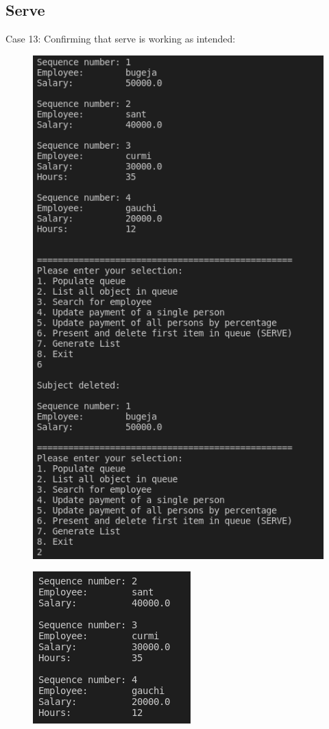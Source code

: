 \documentclass[12pt]{article}
\begin{document}
\subsection{Serve}
Case 13: Confirming that serve is working as intended:
\begin{figure}[h]
\centering
\includegraphics[scale=0.45]{Images/Testing 6/1.png}
\end{figure}

\begin{figure}[h]
\centering
\includegraphics[scale=0.55]{Images/Testing 6/2.png}
\end{figure}
\bigskip
\newpage
\end{document}
